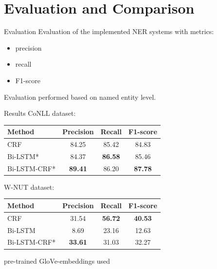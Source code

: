 \documentclass[12pt, tikz]{beamer}
\begin{document}
\section{Evaluation and Comparison}

\begin{frame}[fragile]{Evaluation}
	Evaluation of the implemented NER systems with metrics:
	\begin{itemize}
		\item precision
		\item recall
		\item F1-score
	\end{itemize}

	\pause
	
	Evaluation performed based on named entity level.
\end{frame}

\begin{frame}[fragile]{Results}
	CoNLL dataset:
	\begin{center}
		\begin{tabular}{| l | c | c | c |}
			\hline
			Method & Precision & Recall & F1-score \\ \hline
			CRF & 84.25 & 85.42 & 84.83 \\ \hline
			Bi-LSTM* & 84.37 & \textbf{86.58} & 85.46 \\ \hline
			Bi-LSTM-CRF* & \textbf{89.41} & 86.20 & \textbf{87.78} \\ \hline
		\end{tabular}
	\end{center}

	W-NUT dataset:
	\begin{center}
	\begin{tabular}{| l | c | c | c |}
		\hline
		Method & Precision & Recall & F1-score \\ \hline
		CRF & 31.54 & \textbf{56.72} & \textbf{40.53} \\ \hline
		Bi-LSTM & 8.69 & 23.16 & 12.63 \\ \hline
		Bi-LSTM-CRF* & \textbf{33.61} & 31.03 & 32.27 \\ \hline
	\end{tabular}
\end{center}

{\footnotesize * pre-trained GloVe-embeddings used}

\end{frame}
\end{document}
